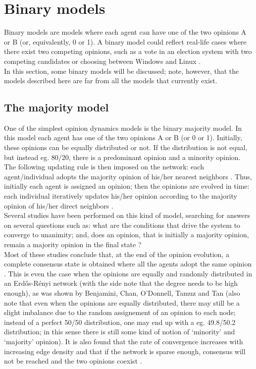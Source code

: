 \documentclass[11 pt , letterpaper , twoside , openright]{book}
\begin{document}
\section{Binary models}\label{Bin}

Binary models are models where each agent can have one of the two opinions A or B (or, equivalently, 0 or 1). A binary model could reflect real-life cases where there exist two competing opinions, such as a vote in an election system with two competing candidates or choosing between Windows and Linux \cite{Nguyen2020}.\\
In this section, some binary models will be discussed; note, however, that the models described here are far from all the models that currently exist.

\subsection{The majority model}

One of the simplest opinion dynamics models is the binary majority model. In this model each agent has one of the two opinions A or B (or 0 or 1). Initially, these opinions can be equally distributed or not. If the distribution is not equal, but instead eg. 80/20, there is a predominant opinion and a minority opinion.\\
The following updating rule is then imposed on the network: each agent/individual adopts the majority opinion of his/her nearest neighbors \cite{Nguyen2020}. Thus, initially each agent is assigned an opinion; then the opinions are evolved in time: each individual iteratively updates his/her opinion according to the majority opinion of his/her direct neighbors \cite{Nguyen2020}.\\
\newline
Several studies have been performed on this kind of model, searching for answers on several questions such as: what are the conditions that drive the system to converge to unanimity; and, does an opinion, that is initially a majority opinion, remain a majority opinion in the final state \cite{Nguyen2020}? \\
Most of these studies conclude that, at the end of the opinion evolution, a complete consensus state is obtained where all the agents adopt the same opinion \cite{Nguyen2020}. This is even the case when the opinions are equally and randomly distributed in an Erd\H{o}s-R\'{e}nyi network (with the side note that the degree needs to be high enough), as was shown by Benjamini, Chan, O'Donnell, Tamuz and Tan \cite{Benjamini2016} (also note that even when the opinions are equally distributed, there may still be a slight imbalance due to the random assignement of an opinion to each node; instead of a perfect 50/50 distribution, one may end up with a eg. 49.8/50.2 distribution; in this sense there is still some kind of notion of `minority' and `majority' opinion). It is also found that the rate of convergence increases with increasing edge density and that if the network is sparse enough, consensus will not be reached and the two opinions coexist \cite{Nguyen2020}.
\end{document}
